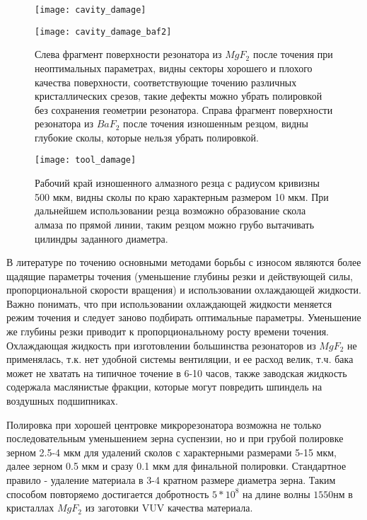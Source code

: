 \begin{figure}[ht]
  \begin{minipage}[ht]{0.49\linewidth}\centering
    \texttt{[image: cavity\_damage]}
  \end{minipage}
  \hfill
  \begin{minipage}[ht]{0.49\linewidth}\centering
    \texttt{[image: cavity\_damage\_baf2]}
  \end{minipage}
  \caption{Слева фрагмент поверхности резонатора из $MgF_2$ после точения при неоптимальных параметрах, видны секторы хорошего и плохого качества поверхности, соответствующие точению различных кристаллических срезов, такие дефекты можно убрать полировкой без сохранения геометрии резонатора. Справа фрагмент поверхности резонатора из $BaF_2$ после точения изношенным резцом, видны глубокие сколы, которые нельзя убрать полировкой.}
  \label{cavity_damage}
\end{figure}

\begin{figure}[ht]
\centering
  \texttt{[image: tool\_damage]}
  \caption{Рабочий край изношенного алмазного резца с радиусом кривизны 500 мкм, видны сколы по краю характерным размером 10 мкм. При дальнейшем использовании резца возможно образование скола алмаза по прямой линии, таким резцом можно грубо вытачивать цилиндры заданного диаметра.}
  \label{tool_damage}
\end{figure}

В литературе по точению основными методами борьбы с износом являются более щадящие параметры точения (уменьшение глубины резки и действующей силы, пропорциональной скорости вращения) и использовании охлаждающей жидкости. Важно понимать, что при использовании охлаждающей жидкости меняется режим точения и следует заново подбирать оптимальные параметры. Уменьшение же глубины резки приводит к пропорциональному росту времени точения. Охлаждающая жидкость при изготовлении большинства резонаторов из $MgF_2$ не применялась, т.к. нет удобной системы вентиляции, и ее расход велик, т.ч. бака может не хватать на типичное точение в 6-10 часов, также заводская жидкость содержала маслянистые фракции, которые могут повредить шпиндель на воздушных подшипниках.

Полировка при хорошей центровке микрорезонатора возможна не только последовательным уменьшением зерна суспензии, но и при грубой полировке зерном 2.5-4 мкм для удалений сколов с характерными размерами 5-15 мкм, далее зерном 0.5 мкм и сразу 0.1 мкм для финальной полировки. Стандартное правило - удаление материала в 3-4 кратном размере диаметра зерна. Таким способом повторяемо достигается добротность $5*10^8$ на длине волны $1550 нм$ в кристаллах $MgF_2$ из заготовки VUV качества материала.

